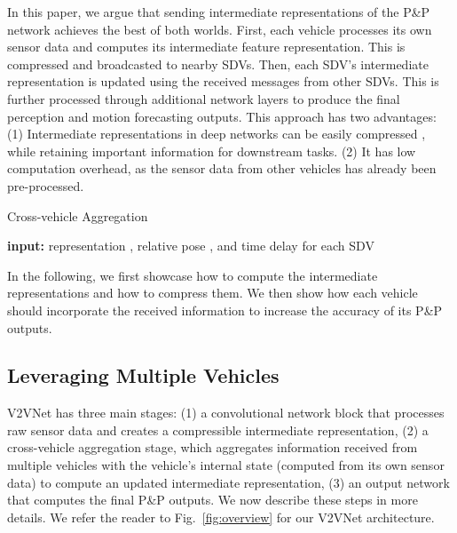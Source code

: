 \documentclass[runningheads]{llncs}
\newcommand{\pnp}{P\&P}
\newcommand{\figref}{Fig.~\ref}
\begin{document}
In this paper, we argue that sending intermediate representations of the
\pnp{}
network achieves the best of both worlds.
First, each vehicle processes its own sensor data and computes its intermediate feature representation. 
This is compressed and broadcasted to nearby SDVs.
Then, 
each SDV's
intermediate representation is updated 
using
the received messages from other SDVs.
This 
is further processed through additional network layers to produce the final perception and motion forecasting
outputs.
This approach has two 
advantages:
(1) Intermediate representations in deep networks can be easily compressed \cite{choi2018high,Wei_2019_CVPR}, while retaining important information for downstream tasks.
(2) It has low computation overhead, as the 
sensor data from other vehicles has already been pre-processed.

\begin{algorithm}[t]
\caption{Cross-vehicle Aggregation}
\label{alg:cva}
\begin{algorithmic}[1]
\State \textbf{input:} 
representation ,  relative pose , and time delay  for each SDV  
\State  {} \label{cva:init}
\EndFor
{} 
 
    \State  {} \label{cva:spatial}
    \State  {} \label{cva:update}
\EndFor
\EndFor
\State  {} \label{cva:final}
\end{algorithmic}
\end{algorithm}

In the following, we first showcase how to compute the intermediate representations and how to compress them.
We then show how  each vehicle should incorporate the received information to increase the accuracy of its
\pnp{}
outputs.

\subsection{Leveraging Multiple Vehicles}
\label{sec:v2vnet}

 V2VNet  has three main stages:
(1) a convolutional network block
 that processes raw sensor 
data and creates a compressible intermediate representation,
(2) a cross-vehicle aggregation stage, which aggregates information received from multiple vehicles with the vehicle's internal state (computed from its own sensor data) to compute an updated intermediate representation,
(3) an output network that computes the final
\pnp{}
outputs.
We now describe these steps in more details.
We refer the reader to \figref{fig:overview} for our 
V2VNet 
architecture.
\end{document}
